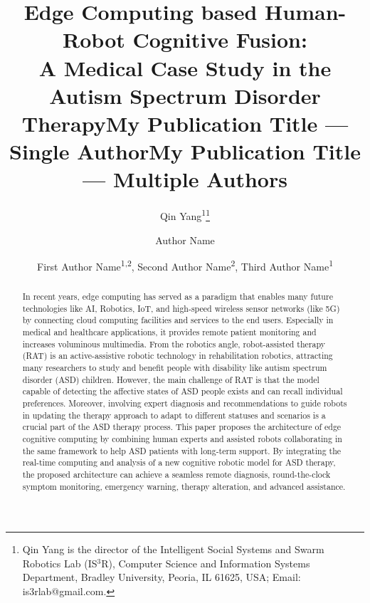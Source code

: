 \documentclass[letterpaper]{article} %
\title{Edge Computing based Human-Robot Cognitive Fusion: \\ A Medical Case Study in the Autism Spectrum Disorder Therapy}
\author{
    Qin Yang\textsuperscript{\rm 1}\thanks{Qin Yang is the director of the Intelligent Social Systems and Swarm Robotics Lab (IS$^3$R), Computer Science and Information Systems Department, Bradley University, Peoria, IL 61625, USA; Email: is3rlab@gmail.com.}
}
\title{My Publication Title --- Single Author}
\author {
    Author Name
}
\title{My Publication Title --- Multiple Authors}
\author {
    First Author Name\textsuperscript{\rm 1,\rm 2},
    Second Author Name\textsuperscript{\rm 2},
    Third Author Name\textsuperscript{\rm 1}
}
\begin{document}
\maketitle

\begin{abstract}

In recent years, edge computing has served as a paradigm that enables many future technologies like AI, Robotics, IoT, and high-speed wireless sensor networks (like 5G) by connecting cloud computing facilities and services to the end users. Especially in medical and healthcare applications, it provides remote patient monitoring and increases voluminous multimedia.
From the robotics angle, robot-assisted therapy (RAT) is an active-assistive robotic technology in rehabilitation robotics, attracting many researchers to study and benefit people with disability like autism spectrum disorder (ASD) children.
However, the main challenge of RAT is that the model capable of detecting the affective states of ASD people exists and can recall individual preferences. Moreover, involving expert diagnosis and recommendations to guide robots in updating the therapy approach to adapt to different statuses and scenarios is a crucial part of the ASD therapy process. This paper proposes the architecture of edge cognitive computing by combining human experts and assisted robots collaborating in the same framework to help ASD patients with long-term support. By integrating the real-time computing and analysis of a new cognitive robotic model for ASD therapy, the proposed architecture can achieve a seamless remote diagnosis, round-the-clock symptom monitoring, emergency warning, therapy alteration, and advanced assistance. 



\end{abstract}
\end{document}
